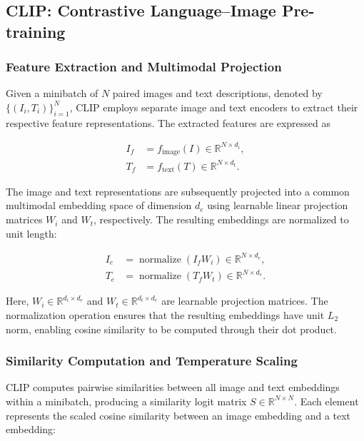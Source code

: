 \documentclass[pdflatex,sn-mathphys-num]{sn-jnl}%
\theoremstyle{thmstyleone}%
\theoremstyle{thmstyletwo}%
\theoremstyle{thmstylethree}%
\begin{document}
\subsection{CLIP: Contrastive Language--Image Pre-training}

\subsubsection{Feature Extraction and Multimodal Projection}

Given a minibatch of $N$ paired images and text descriptions, denoted by $\{(I_i,T_i)\}_{i=1}^{N}$, CLIP employs separate image and text encoders to extract their respective feature representations. The extracted features are expressed as

\begin{align}
I_f &= f_{\mathrm{image}}(I) \in \mathbb{R}^{N \times d_i}, \\
T_f &= f_{\mathrm{text}}(T) \in \mathbb{R}^{N \times d_t}.
\end{align}

The image and text representations are subsequently projected into a common multimodal embedding space of dimension $d_e$ using learnable linear projection matrices $W_i$ and $W_t$, respectively. The resulting embeddings are normalized to unit length:

\begin{align}
I_e &= \operatorname{normalize}(I_f W_i)
\in \mathbb{R}^{N \times d_e}, \\
T_e &= \operatorname{normalize}(T_f W_t)
\in \mathbb{R}^{N \times d_e}.
\end{align}

Here, $W_i \in \mathbb{R}^{d_i \times d_e}$ and $W_t \in \mathbb{R}^{d_t \times d_e}$ are learnable projection matrices. The normalization operation ensures that the resulting embeddings have unit $L_2$ norm, enabling cosine similarity to be computed through their dot product.

\subsubsection{Similarity Computation and Temperature Scaling}

CLIP computes pairwise similarities between all image and text embeddings within a minibatch, producing a similarity logit matrix $S \in \mathbb{R}^{N \times N}$. Each element represents the scaled cosine similarity between an image embedding and a text embedding:
\end{document}
